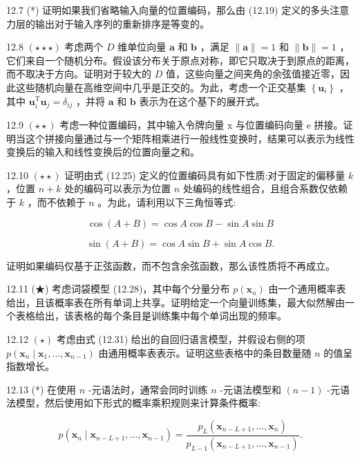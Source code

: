 \documentclass[10pt]{report}
\begin{document}
12.7 (*) 证明如果我们省略输入向量的位置编码，那么由 (12.19) 定义的多头注意力层的输出对于输入序列的重新排序是等变的。

12.8 \(\left( {\star  \star   \star  }\right)\) 考虑两个 \(D\) 维单位向量 \(\mathbf{a}\) 和 \(\mathbf{b}\) ，满足 \(\parallel \mathbf{a}\parallel  = 1\) 和 \(\parallel \mathbf{b}\parallel  = 1\) ，它们来自一个随机分布。假设该分布关于原点对称，即它只取决于到原点的距离，而不取决于方向。证明对于较大的 \(D\) 值，这些向量之间夹角的余弦值接近零，因此这些随机向量在高维空间中几乎是正交的。为此，考虑一个正交基集 \(\left\{  {\mathbf{u}}_{i}\right\}\) ，其中 \({\mathbf{u}}_{i}^{\mathrm{T}}{\mathbf{u}}_{j} = {\delta }_{ij}\) ，并将 \(\mathbf{a}\) 和 \(\mathbf{b}\) 表示为在这个基下的展开式。

12.9 \(\left( {\star  \star  }\right)\) 考虑一种位置编码，其中输入令牌向量 \(\mathrm{x}\) 与位置编码向量 e 拼接。证明当这个拼接向量通过与一个矩阵相乘进行一般线性变换时，结果可以表示为线性变换后的输入和线性变换后的位置向量之和。

12.10 \(\left( {\star  \star  }\right)\) 证明由式 (12.25) 定义的位置编码具有如下性质:对于固定的偏移量 \(k\) ，位置 \(n + k\) 处的编码可以表示为位置 \(n\) 处编码的线性组合，且组合系数仅依赖于 \(k\) ，而不依赖于 \(n\) 。为此，请利用以下三角恒等式:

\[
\cos \left( {A + B}\right)  = \cos A\cos B - \sin A\sin B \tag{12.44}
\]

\[
\sin \left( {A + B}\right)  = \cos A\sin B + \sin A\cos B. \tag{12.45}
\]

证明如果编码仅基于正弦函数，而不包含余弦函数，那么该性质将不再成立。

12.11 (★) 考虑词袋模型 (12.28)，其中每个分量分布 \(p\left( {\mathbf{x}}_{n}\right)\) 由一个通用概率表给出，且该概率表在所有单词上共享。证明给定一个向量训练集，最大似然解由一个表格给出，该表格的每个条目是训练集中每个单词出现的频率。

12.12 \(\left( \star \right)\) 考虑由式 (12.31) 给出的自回归语言模型，并假设右侧的项 \(p\left( {{\mathbf{x}}_{n} \mid  {\mathbf{x}}_{1},\ldots ,{\mathbf{x}}_{n - 1}}\right)\) 由通用概率表表示。证明这些表格中的条目数量随 \(n\) 的值呈指数增长。

12.13 (*) 在使用 \(n\) -元语法时，通常会同时训练 \(n\) -元语法模型和 \(\left( {n - 1}\right)\) -元语法模型，然后使用如下形式的概率乘积规则来计算条件概率:

\[
p\left( {{\mathbf{x}}_{n} \mid  {\mathbf{x}}_{n - L + 1},\ldots ,{\mathbf{x}}_{n - 1}}\right)  = \frac{{p}_{L}\left( {{\mathbf{x}}_{n - L + 1},\ldots ,{\mathbf{x}}_{n}}\right) }{{p}_{L - 1}\left( {{\mathbf{x}}_{n - L + 1},\ldots ,{\mathbf{x}}_{n - 1}}\right) }. \tag{12.46}
\]
\end{document}
